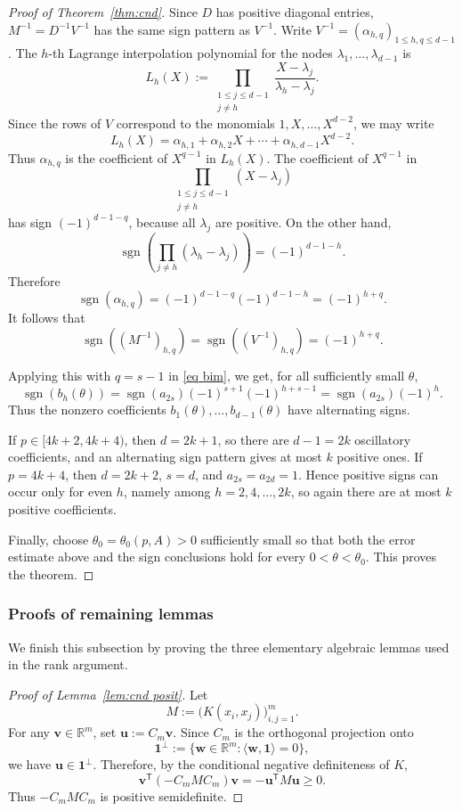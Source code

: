 \documentclass[11pt]{article}
\theoremstyle{definition}
\begin{document}
\begin{proof}[Proof of Theorem~\ref{thm:cnd}]
Since \(D\) has positive diagonal entries, \(M^{-1}=D^{-1}V^{-1}\) has the same
sign pattern as \(V^{-1}\). Write \(V^{-1}=(\alpha_{h,q})_{1\le h,q\le d-1}\).
The \(h\)-th Lagrange interpolation polynomial for the nodes
\(\lambda_1,\dots,\lambda_{d-1}\) is
\[
L_h(X):=
\prod_{\substack{1\le j\le d-1\\ j\ne h}}
\frac{X-\lambda_j}{\lambda_h-\lambda_j}.
\]
Since the rows of \(V\) correspond to the monomials
\(1,X,\dots,X^{d-2}\), we may write
\[
L_h(X)
=
\alpha_{h,1}+\alpha_{h,2}X+\cdots+\alpha_{h,d-1}X^{d-2}.
\]
Thus \(\alpha_{h,q}\) is the coefficient of \(X^{q-1}\) in \(L_h(X)\). The
coefficient of \(X^{q-1}\) in
\[
\prod_{\substack{1\le j\le d-1\\ j\ne h}}(X-\lambda_j)
\]
has sign \((-1)^{d-1-q}\), because all \(\lambda_j\) are positive. On the other
hand,
\[
\operatorname{sgn}\left(\prod_{j\ne h}(\lambda_h-\lambda_j)\right)
=
(-1)^{d-1-h}.
\]
Therefore
\[
\operatorname{sgn}(\alpha_{h,q})
=
(-1)^{d-1-q}(-1)^{d-1-h}
=
(-1)^{h+q}.
\]
It follows that
\[
\operatorname{sgn}((M^{-1})_{h,q})
=
\operatorname{sgn}((V^{-1})_{h,q})
=
(-1)^{h+q}.
\]

Applying this with \(q=s-1\) in \eqref{eq bim}, we get, for all sufficiently small \(\theta\),
\[
\operatorname{sgn}(b_h(\theta))
=
\operatorname{sgn}(a_{2s})(-1)^{s+1}(-1)^{h+s-1}
=
\operatorname{sgn}(a_{2s})(-1)^h.
\]
Thus the nonzero coefficients \(b_1(\theta),\dots,b_{d-1}(\theta)\) have alternating signs.

If \(p\in[4k+2,4k+4)\), then \(d=2k+1\), so there are \(d-1=2k\) oscillatory coefficients, and an alternating sign pattern gives at most \(k\) positive ones. If \(p=4k+4\), then \(d=2k+2\), \(s=d\), and \(a_{2s}=a_{2d}=1\). Hence positive signs can occur only for even \(h\), namely among \(h=2,4,\dots,2k\), so again there are at most \(k\) positive coefficients.

Finally, choose \(\theta_0=\theta_0(p,A)>0\) sufficiently small so that both the error estimate above and the sign conclusions hold for every \(0<\theta<\theta_0\). This proves the theorem.
\end{proof}



\subsubsection{Proofs of remaining lemmas}
We finish this subsection by proving the three elementary algebraic lemmas used in the rank argument.
\begin{proof}[Proof of Lemma~\ref{lem:cnd posit}]
Let
\[
M:=\bigl(K(x_i,x_j)\bigr)_{i,j=1}^m.
\]
For any \(\boldsymbol{v}\in\mathbb R^m\), set
\(
\boldsymbol{u}:=C_m\boldsymbol{v}.
\)
Since \(C_m\) is the orthogonal projection onto
\[
\boldsymbol{1}^{\perp}:=\{\boldsymbol{w}\in\mathbb R^m:\langle \boldsymbol{w},\boldsymbol{1}\rangle=0\},
\]
we have \(\boldsymbol{u}\in\boldsymbol{1}^{\perp}\). Therefore, by the conditional negative definiteness of \(K\),
\[
\boldsymbol{v}^{\mathsf T}(-C_mMC_m)\boldsymbol{v}
=
-\boldsymbol{u}^{\mathsf T}M\boldsymbol{u}
\ge 0.
\]
Thus \(-C_mMC_m\) is positive semidefinite.
\end{proof}
\end{document}
